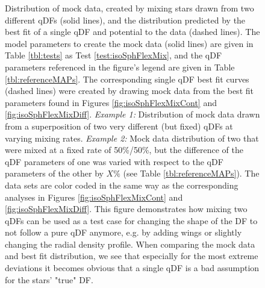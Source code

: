 \begin{figure}
\caption{Distribution of mock data, created by mixing stars drawn from two different qDFs (solid lines), and the distribution predicted by the best fit of a single qDF and potential to the data (dashed lines). The model parameters to create the mock data (solid lines) are given in Table \ref{tbl:tests} as Test \ref{test:isoSphFlexMix}, and the qDF parameters referenced in the figure's legend are given in Table \ref{tbl:referenceMAPs}. The corresponding single qDF best fit curves (dashed lines) were created by drawing mock data from the best fit parameters found in Figures \ref{fig:isoSphFlexMixCont} and \ref{fig:isoSphFlexMixDiff}. \emph{Example 1:} Distribution of mock data drawn from a superposition of two very different (but fixed) qDFs at varying mixing rates. \emph{Example 2:} Mock data distribution of two \MAPs that were mixed at a fixed rate of 50\%/50\%, but the difference of the qDF parameters of one \MAP was varied with respect to the qDF parameters of the other \MAP by $X\%$ (see Table \ref{tbl:referenceMAPs}). The data sets are color coded in the same way as the corresponding analyses in Figures  \ref{fig:isoSphFlexMixCont} and \ref{fig:isoSphFlexMixDiff}. This figure demonstrates how mixing two qDFs can be used as a test case for changing the shape of the DF to not follow a pure qDF anymore, e.g. by adding wings or slightly changing the radial density profile. When comparing the mock data and best fit distribution, we see that especially for the most extreme deviations it becomes obvious that a single qDF is a bad assumption for the stars' "true" DF.}
\label{fig:isoSphFlexMix_mockdata_residuals}
\end{figure}



